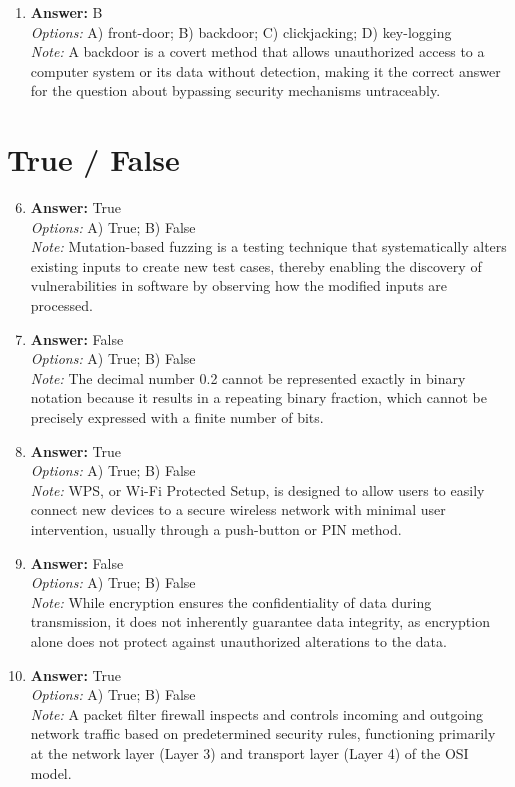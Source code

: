 \documentclass[12pt]{article}
\begin{document}
\begin{enumerate}[label=\arabic*.]
\\ \textit{Note:} The correct answer is based on the principle of the One-Time Pad (OTP) encryption, which states that the key can be derived from the ciphertext and plaintext using the XOR operation, as the relationship is defined by the equation k = m XOR c.
\item \textbf{Answer:} B
\\ \textit{Options:} A) front-door; B) backdoor; C) clickjacking; D) key-logging
\\ \textit{Note:} A backdoor is a covert method that allows unauthorized access to a computer system or its data without detection, making it the correct answer for the question about bypassing security mechanisms untraceably.
\end{enumerate}

\section*{True / False}
\begin{enumerate}[label=\arabic*.]
\setcounter{enumi}{5}
\item \textbf{Answer:} True
\\ \textit{Options:} A) True; B) False
\\ \textit{Note:} Mutation-based fuzzing is a testing technique that systematically alters existing inputs to create new test cases, thereby enabling the discovery of vulnerabilities in software by observing how the modified inputs are processed.
\item \textbf{Answer:} False
\\ \textit{Options:} A) True; B) False
\\ \textit{Note:} The decimal number 0.2 cannot be represented exactly in binary notation because it results in a repeating binary fraction, which cannot be precisely expressed with a finite number of bits.
\item \textbf{Answer:} True
\\ \textit{Options:} A) True; B) False
\\ \textit{Note:} WPS, or Wi-Fi Protected Setup, is designed to allow users to easily connect new devices to a secure wireless network with minimal user intervention, usually through a push-button or PIN method.
\item \textbf{Answer:} False
\\ \textit{Options:} A) True; B) False
\\ \textit{Note:} While encryption ensures the confidentiality of data during transmission, it does not inherently guarantee data integrity, as encryption alone does not protect against unauthorized alterations to the data.
\item \textbf{Answer:} True
\\ \textit{Options:} A) True; B) False
\\ \textit{Note:} A packet filter firewall inspects and controls incoming and outgoing network traffic based on predetermined security rules, functioning primarily at the network layer (Layer 3) and transport layer (Layer 4) of the OSI model.
\end{enumerate}
\end{document}
